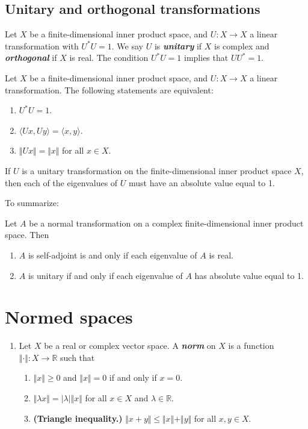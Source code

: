 \documentclass{article}
\theoremstyle{definition}
\newcommand{\R}{\mathbb{R}}
\begin{document}
	\subsection{Unitary and orthogonal transformations}
	Let $X$ be a finite-dimensional inner product space, and $U:X\to X$ a linear transformation with $U^*U=1$. We say $U$ is \textbf{\textit{unitary}} if $X$ is complex and \textbf{\textit{orthogonal}} if $X$ is real. The condition $U^*U=1$ implies that $UU^*=1$.
	
	\begin{thm}
		Let $X$ be a finite-dimensional inner product space, and $U:X\to X$ a linear transformation. The following statements are equivalent:
		\begin{enumerate}
			\item $U^*U=1$.
			\item $\langle Ux,Uy\rangle=\langle x,y\rangle$.
			\item $\Vert Ux\Vert=\Vert x\Vert$ for all $x\in X$.
		\end{enumerate}
	\end{thm}
	\begin{thm}
		If $U$ is a unitary transformation on the finite-dimensional inner product space $X$, then each of the eigenvalues of $U$ must have an absolute value equal to 1.
	\end{thm}
	To summarize:
	\begin{thm}
		Let $A$ be a normal transformation on a complex finite-dimensional inner product space. Then
		\begin{enumerate}
			\item $A$ is self-adjoint is and only if each eigenvalue of $A$ is real.
			\item $A$ is unitary if and only if each eigenvalue of $A$ has absolute value equal to 1.
		\end{enumerate}
	\end{thm}

\section{Normed spaces}
\begin{enumerate}
	\item Let $X$ be a real or complex vector space. A \textbf{\textit{norm}} on $X$ is a function $\Vert \cdot\Vert:X\to\R$ such that
\begin{enumerate}
	\item $\Vert x\Vert\geq0$ and $\Vert x\Vert=0$ if and only if $x=0$.
	\item $\Vert\lambda x\Vert=|\lambda|\Vert x\Vert$ for all $x\in X$ and $\lambda\in\R$.
	\item \textbf{(Triangle inequality.)} $\Vert x+y\Vert\leq\Vert x\Vert+\Vert y\Vert$ for all $x,y\in X$.
\end{enumerate}

\end{enumerate}
\end{document}
